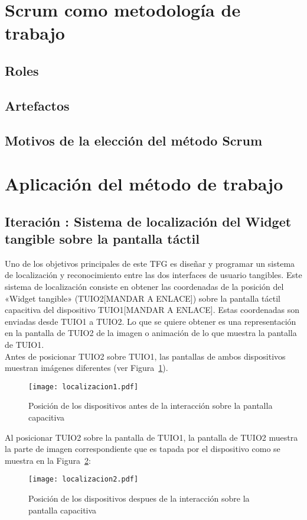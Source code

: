 \section{Scrum como metodología de trabajo}



\subsection{Roles}



\subsection{Artefactos}



\subsection{Motivos de la elección del método Scrum}



\section{Aplicación del método de trabajo}

\subsection{Iteración : Sistema de localización del Widget tangible sobre la pantalla táctil}
Uno de los objetivos principales de este TFG es diseñar y programar un sistema de localización y reconocimiento entre las dos interfaces de usuario tangibles. Este sistema de localización consiste en obtener las coordenadas de la posición del «Widget tangible» (TUIO2[MANDAR A ENLACE]) sobre la pantalla táctil capacitiva del dispositivo TUIO1[MANDAR A ENLACE]. Estas coordenadas son enviadas desde TUIO1 a TUIO2. Lo que se quiere obtener es una representación en la pantalla de TUIO2 de la imagen o animación de lo que muestra la pantalla de TUIO1.\\
Antes de posicionar TUIO2 sobre TUIO1, las pantallas de ambos dispositivos muestran imágenes diferentes (ver Figura~\ref{fig:Localizacion1}).
\begin{figure}[!h]
\begin{center}
\texttt{[image: localizacion1.pdf]}
\caption{Posición de los dispositivos antes de la interacción sobre la pantalla capacitiva}
\label{fig:Localizacion1}
\end{center}
\end{figure}
Al posicionar TUIO2 sobre la pantalla de TUIO1, la pantalla de TUIO2 muestra la parte de imagen correspondiente que es tapada por el dispositivo como se muestra en la Figura~\ref{fig:Localizacion2}:
\begin{figure}[!h]
\begin{center}
\texttt{[image: localizacion2.pdf]}
\caption{Posición de los dispositivos despues de la interacción sobre la pantalla capacitiva}
\label{fig:Localizacion2}
\end{center}
\end{figure}


